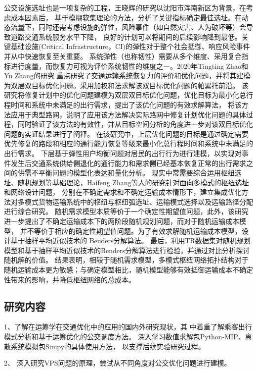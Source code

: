 公交设施选址也是一项复杂的工程，王晓辉的研究\cite{snu2012}以沈阳市浑南新区为背景，在考虑成本因素后，
基于模糊软集理论的方法，分析了关键指标确定最佳选址。在动态流量下，同时还需考虑设施的弹性，风险事件（如自然灾害、人为破坏等）会导致道路交通系统服务水平下降，
良好的计划可以将期间的后续影响降到最低。关键基础设施(Critical Infrastructure，CI)的弹性对于整个社会抵御、响应风险事件并从中快速恢复至关重要。
系统弹性（也称韧性）需要从多个维度、采用复合指标进行度量，而恢复力可视为评价系统韧性的维度之一。2020年Tingting Zhao和Yu Zhang的研究\cite{ZHAO2020102700}
重点研究了交通运输系统恢复力的评价和优化问题，并将其建模为双层双目标优化问题。采用加权和法求解该双目标优化问题的帕累托前沿。
该研究将修复计划中的优化问题建模为双层双目标优化问题，优化目标为最小化总行程时间和系统中未满足的出行需求，提出了该优化问题的有效求解算法，
将该方法应用于典型路网，说明了应用该方法解决实际路网中修复计划优化问题的具体过程，同时验证了该方法的有效性，并从目标空间分析的角度进一步对该双目标优化问题的实证结果进行了阐释。
在该研究中，上层优化问题的目标是通过确定需要优先修复的路段和相应的通行能力恢复等级来最小化总行程时间和系统中未满足的出行需求。
下层基于弹性用户均衡问题对居民的出行行为进行建模，以实现对事件发生后交通系统供给侧退化的通行能力和需求侧已经基本恢复正常的出行需求之间的供需不平衡问题的模型化表达和量化分析。
现实中常需要综合运用枢纽选址、随机规划等基础理论，Haifeng Zhang等人的研究\cite{ZHANG2022108493}针对面向多模式的枢纽选址和网络设计问题，
分别在不确定需求和不确定运输成本情形下，建立集成优化方法对多模式货物运输系统中的枢纽与枢纽弧选址、运输模式选择以及运输路径分配进行综合研究。
随机需求模型本质等价于一个确定性期望值问题，此外，该研究进一步提出了不确定运输成本下的两阶段随机规划问题，而对于随机运输成本模型，
并不等价于相应的确定性期望值问题。为了有效求解随机运输成本模型，设计基于抽样平均近似技术的 Benders分解算法。
最后，利用TR数据集对随机规划模型和基于抽样平均近似技术的Benders分解算法进行检验，并通过对比分析探讨随机解的价值。
结果表明，相较于随机需求模型，多模式枢纽网络拓扑结构对于随机运输成本更为敏感；与确定模型相比，随机模型能够有效抵御运输成本不确定性带来的影响，并降低枢纽网络的总成本。
\subsection{研究内容}
1、了解在运筹学在交通优化中的应用的国内外研究现状，其
中着重了解乘客出行模式分析和基于运筹优化的公交调度方法。
深入学习数值求解包Python-MIP、离散系统模拟包Simpy的具体使用方法，
以支撑后续实验研究过程。

2、 深入研究VPS问题的原理，尝试从不同角度对公交优化问题进行建模。

